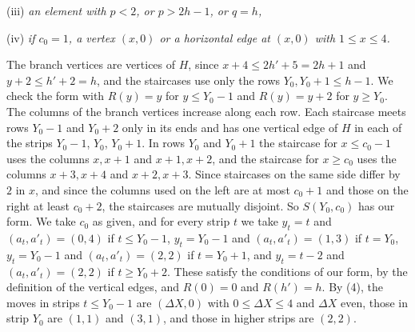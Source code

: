 {\hspace*{12pt}(iii) \textit{an element with $p < 2$, or $p > 2h - 1$, or $q = h$,}

\hspace*{12pt}(iv) \textit{if $c_0 = 1$, a vertex $(x, 0)$ or a horizontal edge at $(x, 0)$ with $1 \le x \le 4$.}

The branch vertices are vertices of $H$, since $x + 4 \le 2h' + 5 = 2h + 1$ and $y + 2 \le h' + 2 = h$, and the staircases use only the rows $Y_0, Y_0 + 1 \le h - 1$. We check the form with $R(y) = y$ for $y \le Y_0 - 1$ and $R(y) = y + 2$ for $y \ge Y_0$. The columns of the branch vertices increase along each row. Each staircase meets rows $Y_0 - 1$ and $Y_0 + 2$ only in its ends and has one vertical edge of $H$ in each of the strips $Y_0 - 1$, $Y_0$, $Y_0 + 1$. In rows $Y_0$ and $Y_0 + 1$ the staircase for $x \le c_0 - 1$ uses the columns $x, x + 1$ and $x + 1, x + 2$, and the staircase for $x \ge c_0$ uses the columns $x + 3, x + 4$ and $x + 2, x + 3$. Since staircases on the same side differ by $2$ in $x$, and since the columns used on the left are at most $c_0 + 1$ and those on the right at least $c_0 + 2$, the staircases are mutually disjoint. So $S(Y_0, c_0)$ has our form. We take $c_0$ as given, and for every strip $t$ we take $y_t = t$ and $(a_t, a'_t) = (0, 4)$ if $t \le Y_0 - 1$, $y_t = Y_0 - 1$ and $(a_t, a'_t) = (1, 3)$ if $t = Y_0$, $y_t = Y_0 - 1$ and $(a_t, a'_t) = (2, 2)$ if $t = Y_0 + 1$, and $y_t = t - 2$ and $(a_t, a'_t) = (2, 2)$ if $t \ge Y_0 + 2$. These satisfy the conditions of our form, by the definition of the vertical edges, and $R(0) = 0$ and $R(h') = h$. By (4), the moves in strips $t \le Y_0 - 1$ are $(\Delta X, 0)$ with $0 \le \Delta X \le 4$ and $\Delta X$ even, those in strip $Y_0$ are $(1, 1)$ and $(3, 1)$, and those in higher strips are $(2, 2)$.

}
